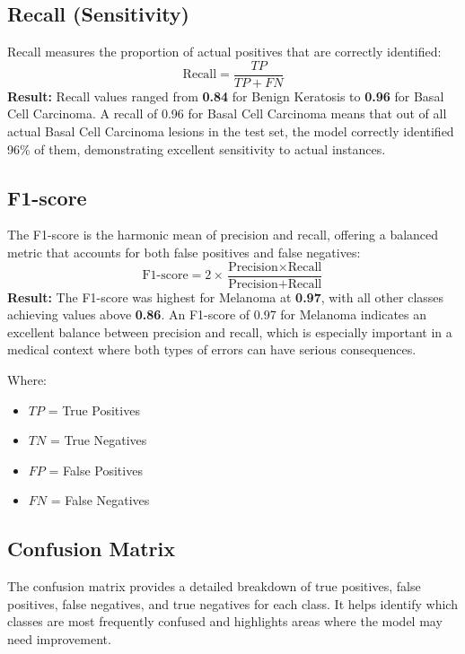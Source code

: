 \documentclass[a4paper,12pt]{report}
\begin{document}
\begin{spacing}{1.5}
    
    \newpage
    \subsection{Recall (Sensitivity)}
    Recall measures the proportion of actual positives that are correctly identified:
    \[
        \text{Recall} = \frac{TP}{TP + FN}
    \]
    \textbf{Result:} Recall values ranged from \textbf{0.84} for Benign Keratosis to \textbf{0.96} for Basal Cell Carcinoma.  
    A recall of 0.96 for Basal Cell Carcinoma means that out of all actual Basal Cell Carcinoma lesions in the test set, the model correctly identified 96\% of them, demonstrating excellent sensitivity to actual instances.
    \subsection{F1-score}
    The F1-score is the harmonic mean of precision and recall, offering a balanced metric that accounts for both false positives and false negatives:
    \[
        \text{F1-score} = 2 \times \frac{\text{Precision} \times \text{Recall}}{\text{Precision} + \text{Recall}}
    \]
    \textbf{Result:} The F1-score was highest for Melanoma at \textbf{0.97}, with all other classes achieving values above \textbf{0.86}.  
    An F1-score of 0.97 for Melanoma indicates an excellent balance between precision and recall, which is especially important in a medical context where both types of errors can have serious consequences.
    
    Where:
    \begin{itemize}
        \item $TP$ = True Positives
        \item $TN$ = True Negatives
        \item $FP$ = False Positives
        \item $FN$ = False Negatives
    \end{itemize}
    
    \subsection{Confusion Matrix}
    The confusion matrix provides a detailed breakdown of true positives, false positives, false negatives, and true negatives for each class. It helps identify which classes are most frequently confused and highlights areas where the model may need improvement.
    

\end{spacing}
\end{document}
